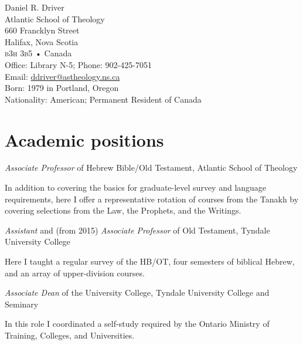 \documentclass[11pt]{article}
\newcommand{\years}[1]{\marginnote{\footnotesize #1}}
\begin{document}
{\Huge Daniel R. Driver}\\[3em]
%
Atlantic School of Theology\\
660 Francklyn Street\\
Halifax, Nova Scotia\\
\textsc{b3h 3b5} • Canada\\[1em]

%
Office: Library N-5; Phone: 902-425-7051\\
Email: \href{mailto:ddriver@astheology.ns.ca}{ddriver@astheology.ns.ca}\\[1em]
%
Born: 1979 in Portland, Oregon\\
Nationality: American; Permanent Resident of Canada
\vfill

\section*{Academic positions}
\years{2016---} \emph{Associate Professor} of Hebrew Bible/Old Testament, Atlantic School of Theology
	\begin{quoting}
	In addition to covering the basics for graduate-level survey and
	language requirements, here I offer a representative rotation of
	courses from the Tanakh by covering selections from the Law, the
	Prophets, and the Writings.
	\end{quoting}


\years{2008--2016} \emph{Assistant} and (from 2015) \emph{Associate Professor} of Old Testament, Tyndale University College
	\begin{quoting}
	Here I taught a regular survey of the HB/OT, four semesters of
	biblical Hebrew, and an array of upper-division courses.
	\end{quoting}

\years{2011--2013}
\emph{Associate Dean} of the University College, Tyndale University College and Seminary
	\begin{quoting}
	In this role I coordinated a self-study required by the Ontario
	Ministry of Training, Colleges, and Universities.
	\end{quoting}
\end{document}
